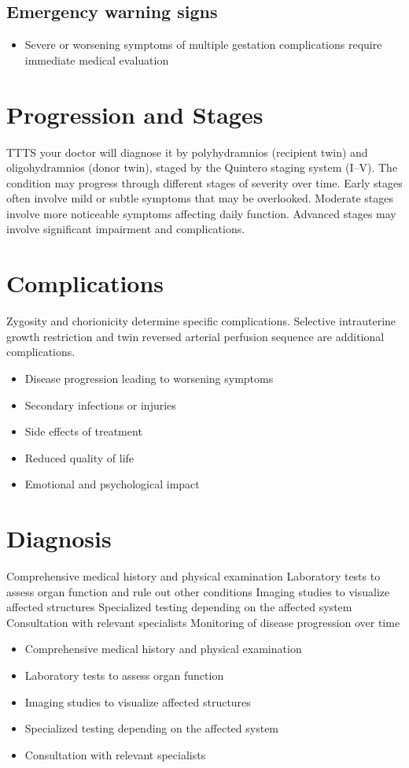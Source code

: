 \subsection{Emergency warning signs}
\begin{itemize}[noitemsep]
  \item Severe or worsening symptoms of multiple gestation complications require immediate medical evaluation
\end{itemize}
\section{Progression and Stages}
TTTS your doctor will diagnose it by polyhydramnios (recipient twin) and oligohydramnios (donor twin), staged by the Quintero staging system (I--V). The condition may progress through different stages of severity over time. Early stages often involve mild or subtle symptoms that may be overlooked. Moderate stages involve more noticeable symptoms affecting daily function. Advanced stages may involve significant impairment and complications.
\section{Complications}
Zygosity and chorionicity determine specific complications. Selective intrauterine growth restriction and twin reversed arterial perfusion sequence are additional complications.

\begin{itemize}[noitemsep]
  \item Disease progression leading to worsening symptoms
  \item Secondary infections or injuries
  \item Side effects of treatment
  \item Reduced quality of life
  \item Emotional and psychological impact
\end{itemize}
\section{Diagnosis}
Comprehensive medical history and physical examination Laboratory tests to assess organ function and rule out other conditions Imaging studies to visualize affected structures Specialized testing depending on the affected system Consultation with relevant specialists Monitoring of disease progression over time

\begin{itemize}[noitemsep]
  \item Comprehensive medical history and physical examination
  \item Laboratory tests to assess organ function
  \item Imaging studies to visualize affected structures
  \item Specialized testing depending on the affected system
  \item Consultation with relevant specialists
\end{itemize}

